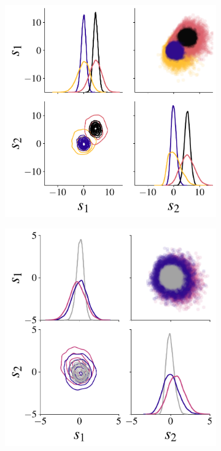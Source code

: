 \documentclass[twoside,11pt]{article}
\newcommand{\0}{\boldsymbol{0}}
\begin{document}
\begin{figure}[t]
    \centering
    \begin{subfigure}[t]{0.45\linewidth}
        \includegraphics[width=\linewidth]{plots/abf_mvn_means_sufficient_pairplot_new.pdf}
    \end{subfigure}\hfill
    \begin{subfigure}[t]{0.45\linewidth}
        \includegraphics[width=\linewidth]{plots/abf_mvn_means_sufficient_simulator_noise_pairplot_new.pdf}

\end{subfigure}
\end{figure}
\end{document}
